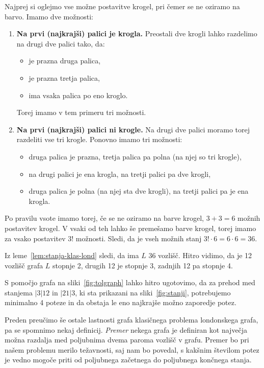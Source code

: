 \documentclass[twoside,11pt]{article}
\begin{document}
\begin{dokaz}
Najprej si oglejmo vse možne postavitve krogel, pri čemer se ne oziramo na barvo.
Imamo dve možnosti:
\begin{enumerate}
    \item \textbf{Na prvi (najkrajši) palici je krogla.}
    Preostali dve krogli lahko razdelimo na drugi dve palici tako, da:
    \begin{itemize}[label={--}]
        \item je prazna druga palica,
        \item je prazna tretja palica,
        \item ima vsaka palica po eno kroglo.
    \end{itemize}
    Torej imamo v tem primeru tri možnosti.
    
    \item \textbf{Na prvi (najkrajši) palici ni krogle.}
    Na drugi dve palici moramo torej razdeliti vse tri krogle.
    Ponovno imamo tri možnosti:
    \begin{itemize}[label={--}]
        \item druga palica je prazna, tretja palica pa polna (na njej so tri krogle),
        \item na drugi palici je ena krogla, na tretji palici pa dve krogli,
        \item druga palica je polna (na njej sta dve krogli), na tretji palici pa je ena krogla.
    \end{itemize}
\end{enumerate}
Po pravilu vsote imamo torej, če se ne oziramo na barve krogel, $3+3=6$ možnih postavitev krogel.
V vsaki od teh lahko še premešamo barve krogel, torej imamo za vsako postavitev $3!$ možnosti. Sledi, da je vseh možnih stanj $3! \cdot 6 = 6 \cdot 6 = 36$.\QED
\end{dokaz}

Iz leme~\ref{lem:stanja-klas-lond} sledi, da ima $L$ 36 vozlišč. Hitro vidimo, da je 12 vozlišč grafa $L$ stopnje 2, drugih 12 je stopnje 3, zadnjih 12 pa stopnje 4. 

\begin{primer}
    S pomočjo grafa na sliki~\ref{fig:tolgraph} lahko hitro ugotovimo, da za prehod med stanjema $|3|12$ in $|21|3$, ki sta prikazani na sliki~\ref{fig:stanji}, potrebujemo minimalno 4 poteze in da obstaja le eno najkrajše možno zaporedje potez.
\end{primer}

Preden preučimo še ostale lastnosti grafa klasičnega problema londonskega grafa, pa se spomnimo nekaj definicij. \emph{Premer} nekega grafa je definiran kot največja možna razdalja med poljubnima dvema paroma vozlišč v grafu. Premer bo pri našem problemu merilo težavnosti, saj nam bo povedal, s kakšnim številom potez je vedno mogoče priti od poljubnega začetnega do poljubnega končnega stanja.
\end{document}
